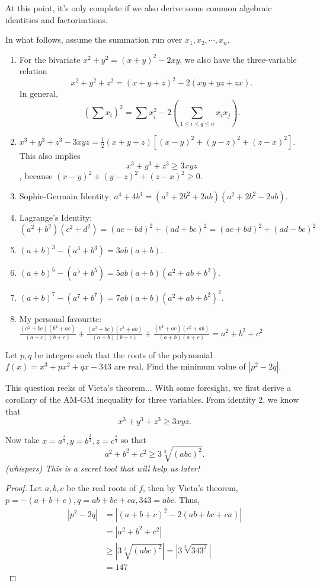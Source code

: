 \documentclass[../jarvis.tex]{subfiles}
\begin{document}
At this point, it's only complete if we also derive some common algebraic identities and factorisations. 
\begin{proposition}[Classic]
    In what follows, assume the summation run over $x_1,x_2,\cdots,x_n$.
    \begin{enumerate}
        \item For the bivariate $x^2+y^2=(x+y)^2-2xy$, we also have the three-variable relation $$x^2+y^2+z^2=(x+y+z)^2-2(xy+yz+zx).$$
        In general, $$\left(\sum x_i\right)^2=\sum x_i^2-2\left(\sum_{1\leq i\leq q\leq n}x_ix_j\right).$$

        \item $x^3+y^3+z^3-3xyz=\frac{1}{2}(x+y+z)[(x-y)^2+(y-z)^2+(z-x)^2]$.
        This also implies $$x^3+y^3+z^3 \geq 3xyz$$, because
        $(x-y)^2+(y-z)^2+(z-x)^2\geq 0$.
        \item Sophie-Germain Identity: $a^4+4b^4=(a^2+2b^2+2ab)(a^2+2b^2-2ab)$.
        \item Lagrange's Identity: $(a^2+b^2)(c^2+d^2)=(ac-bd)^2+(ad+bc)^2=(ac+bd)^2+(ad-bc)^2$
        \item $(a+b)^3-(a^3+b^3)=3ab(a+b)$.
        \item $(a+b)^5-(a^5+b^5)=5ab(a+b)(a^2+ab+b^2)$.
        \item $(a+b)^7-(a^7+b^7)=7ab(a+b)(a^2+ab+b^2)^2$.
        \item My personal favourite: $\frac{(a^2+bc)(b^2+ac)}{(a+c)(b+c)}+\frac{(a^2+bc)(c^2+ab)}{(a+b)(b+c)}+\frac{(b^2+ac)(c^2+ab)}{(a+b)(a+c)}=a^2+b^2+c^2$
    \end{enumerate}
\end{proposition}
\begin{example}[2016 SMO(O) P15]
    Let $p,q$ be integers such that the roots of the polynomial $f(x)=x^3+px^2+qx-343$ are real. Find the minimum value of $|p^2-2q|$.
\end{example}
This question reeks of Vieta's theorem... With some foresight, we first derive a corollary of the AM-GM inequality for three variables. From identity 2, we know that
    $$x^3+y^3+z^3 \geq 3xyz.$$

    Now take $x=a^{\frac{2}{3}}, y=b^{\frac{2}{3}}, z=c^{\frac{2}{3}}$ so that
    $$a^2+b^2+c^2\geq 3\sqrt[3]{(abc)^2}.$$
    \textit{(whispers) This is a secret tool that will help us later!}
\begin{proof}
    
    Let $a,b,c$ be the real roots of $f$, then by Vieta's theorem, $p=-(a+b+c), q=ab+bc+ca, 343=abc$.
    Thus,
    \begin{align*}
        |p^2-2q|&=|(a+b+c)^2-2(ab+bc+ca)| \\
        &=|a^2+b^2+c^2| \\
        &\geq |3\sqrt[3]{(abc)^2}| = |3\sqrt[3]{343^2}| \\
        &=\boxed{147}
    \end{align*}
\end{proof}
\end{document}
